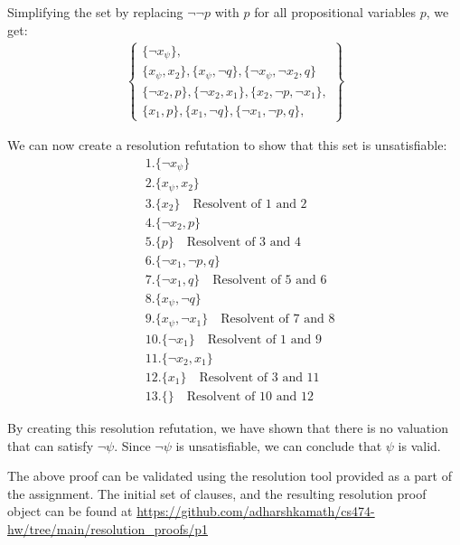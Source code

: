 \documentclass[12pt,letterpaper, onecolumn]{exam}
\newcommand{\link}[1]{{\color{blue}\href{#1}{#1}}}
\begin{document}
\begin{questions}
	Simplifying the set by replacing $ \neg \neg p $ with $ p $ for all propositional variables $p$, we get:
	\begin{align*}
		\left .
			\begin{cases}
				\{ \neg x_{\psi} \}, \\
				\{ x_{\psi}, x_2 \}, \{ x_{\psi}, \neg q \}, \{ \neg x_{\psi}, \neg x_2, q \} \\
				\{ \neg x_2, p \}, \{ \neg x_2, x_1 \}, \{ x_2, \neg p, \neg x_1  \}, \\
				\{ x_1, p \}, \{ x_1, \neg q \}, \{ \neg x_1, \neg p, q \},
			\end{cases}
		\right\}
	\end{align*}

	We can now create a resolution refutation to show that this set is unsatisfiable:
	\begin{align*}
		& 1. \{ \neg x_{\psi} \} \\
		& 2. \{ x_{\psi}, x_2 \} \\
		& 3. \{ x_2 \} \quad \text{Resolvent of 1 and 2} \\
		& 4. \{ \neg x_2, p \} \\
		& 5. \{ p \} \quad \text{Resolvent of 3 and 4} \\
		& 6. \{ \neg x_1, \neg p, q \} \\
		& 7. \{ \neg x_1, q \} \quad \text{Resolvent of 5 and 6} \\
		& 8. \{ x_{\psi}, \neg q \} \\ 
		& 9. \{ x_{\psi}, \neg x_1 \} \quad \text{Resolvent of 7 and 8} \\
		& 10. \{ \neg x_1 \} \quad \text{Resolvent of 1 and 9} \\
		& 11. \{ \neg x_2, x_1 \} \\
		& 12. \{ x_1 \} \quad \text{Resolvent of 3 and 11} \\
		& 13. \{  \} \quad \text{Resolvent of 10 and 12}
	\end{align*}

	By creating this resolution refutation, we have shown that there is no valuation that can satisfy $ \neg \psi $.
	Since $ \neg \psi $ is unsatisfiable, we can conclude that $ \psi $ is valid.

	The above proof can be validated using the resolution tool provided as a part of the assignment.
	The initial set of clauses, and the resulting resolution proof object can be found at 
	\link{https://github.com/adharshkamath/cs474-hw/tree/main/resolution\_proofs/p1}


\end{questions}
\end{document}
